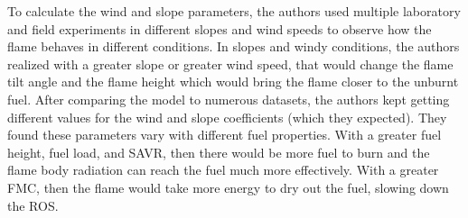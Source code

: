 \documentclass{article}
\begin{document}
To calculate the wind and slope parameters, the authors used multiple laboratory and field experiments in different slopes and wind speeds to observe how the flame behaves in different conditions. In slopes and windy conditions, the authors realized with a greater slope or greater wind speed, that would change the flame tilt angle and the flame height which would bring the flame closer to the unburnt fuel. After comparing the model to numerous datasets, the authors kept getting different values for the wind and slope coefficients (which they expected). They found these parameters vary with different fuel properties. With a greater fuel height, fuel load, and SAVR, then there would be more fuel to burn and the flame body radiation can reach the fuel much more effectively. With a greater FMC, then the flame would take more energy to dry out the fuel, slowing down the ROS. 
\end{document}
